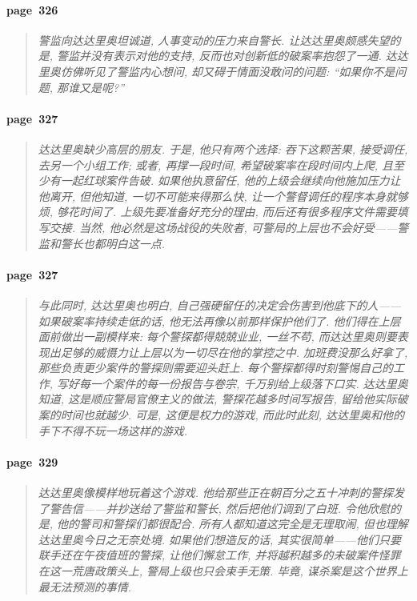 \paragraph*{page~326}
\begin{quotation}
    \itshape
    警监向达达里奥坦诚道, 人事变动的压力来自警长. 让达达里奥颇感失望的是, 警监并没有表示对他的支持, 反而也对创新低的破案率抱怨了一通. 达达里奥仿佛听见了警监内心想问, 却又碍于情面没敢问的问题: ``如果你不是问题, 那谁又是呢?'' 
\end{quotation}

\paragraph*{page~327}
\begin{quotation}
    \itshape
    达达里奥缺少高层的朋友. 于是, 他只有两个选择: 吞下这颗苦果, 接受调任, 去另一个小组工作; 或者, 再撑一段时间, 希望破案率在段时间内上爬, 且至少有一起红球案件告破. 如果他执意留任, 他的上级会继续向他施加压力让他离开, 但他知道, 一切不可能来得那么快, 让一个警督调任的程序本身就够烦, 够花时间了. 上级先要准备好充分的理由, 而后还有很多程序文件需要填写交接. 当然, 他必然是这场战役的失败者, 可警局的上层也不会好受------警监和警长也都明白这一点. 
\end{quotation}

\paragraph*{page~327}
\begin{quotation}
    \itshape
    与此同时, 达达里奥也明白, 自己强硬留任的决定会伤害到他底下的人------如果破案率持续走低的话, 他无法再像以前那样保护他们了. 他们得在上层面前做出一副模样来: 每个警探都得兢兢业业, 一丝不苟, 而达达里奥则要表现出足够的威慑力让上层以为一切尽在他的掌控之中. 加班费没那么好拿了, 那些负责更少案件的警探则需要迎头赶上. 每个警探都得时刻警惕自己的工作, 写好每一个案件的每一份报告与卷宗, 千万别给上级落下口实. 达达里奥知道, 这是顺应警局官僚主义的做法, 警探花越多时间写报告, 留给他实际破案的时间也就越少. 可是, 这便是权力的游戏, 而此时此刻, 达达里奥和他的手下不得不玩一场这样的游戏. 
\end{quotation}

\paragraph*{page~329}
\begin{quotation}
    \itshape
    达达里奥像模样地玩着这个游戏. 他给那些正在朝百分之五十冲刺的警探发了警告信------并抄送给了警监和警长, 然后把他们调到了白班. 令他欣慰的是, 他的警司和警探们都很配合. 所有人都知道这完全是无理取闹, 但也理解达达里奥今日之无奈处境. 如果他们想造反的话, 其实很简单------他们只要联手还在午夜值班的警探, 让他们懈怠工作, 并将越积越多的未破案件怪罪在这一荒唐政策头上, 警局上级也只会束手无策. 毕竟, 谋杀案是这个世界上最无法预测的事情. 
\end{quotation}

